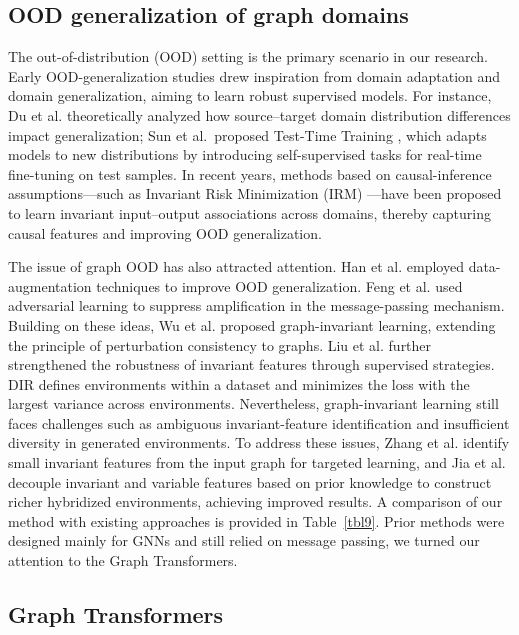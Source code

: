 \documentclass[a4paper,fleqn]{cas-dc}
\begin{document}
\subsection{OOD generalization of graph domains}
The out-of-distribution (OOD) setting \cite{yang2024generalized} is the primary scenario in our research. Early OOD-generalization studies drew inspiration from domain adaptation and domain generalization, aiming to learn robust supervised models. For instance, Du et al. \cite{DU2025113316} theoretically analyzed how source–target domain distribution differences impact generalization; Sun et al.\ proposed Test-Time Training \cite{sun2020test}, which adapts models to new distributions by introducing self-supervised tasks for real-time fine-tuning on test samples. In recent years, methods based on causal-inference assumptions—such as Invariant Risk Minimization (IRM) \cite{DBLP:journals/corr/abs-1907-02893}—have been proposed to learn invariant input–output associations across domains, thereby capturing causal features and improving OOD generalization.

{\color{blue}The issue of graph OOD has also attracted attention. Han et al.\cite{han2022g,verma2019manifold} employed data-augmentation techniques to improve OOD generalization. Feng et al.\cite{feng2019graph} used adversarial learning to suppress amplification in the message-passing mechanism. Building on these ideas, Wu et al.\cite{wu2022handling} proposed graph-invariant learning, extending the principle of perturbation consistency to graphs. Liu et al.\cite{liu2023flood} further strengthened the robustness of invariant features through supervised strategies. DIR \cite{wu2022discovering} defines environments within a dataset and minimizes the loss with the largest variance across environments. Nevertheless, graph-invariant learning still faces challenges such as ambiguous invariant-feature identification and insufficient diversity in generated environments. To address these issues, Zhang et al.\cite{ZHANG2024111620} identify small invariant features from the input graph for targeted learning, and Jia et al.\cite{jia2024graph} decouple invariant and variable features based on prior knowledge to construct richer hybridized environments, achieving improved results. A comparison of our method with existing approaches is provided in Table~\ref{tbl9}. Prior methods were designed mainly for GNNs and still relied on message passing, we turned our attention to the Graph Transformers.}



\subsection{Graph Transformers}
\end{document}
